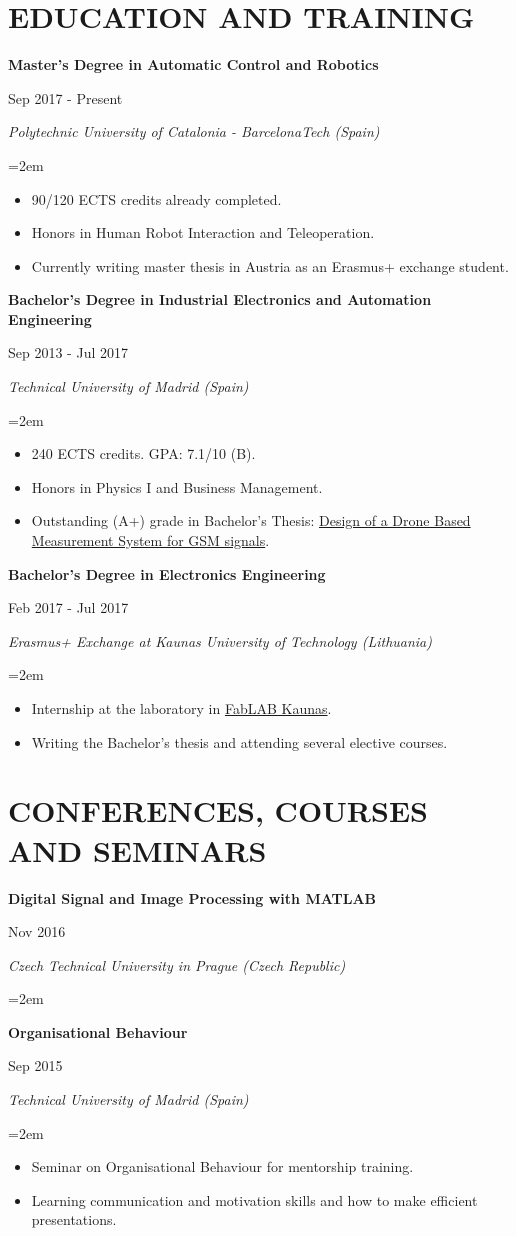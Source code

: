 \documentclass[10pt,a4paper,oneside]{book}
\newcommand{\sepspace}{\vspace*{0pt}}		%
\newcommand{\NewPart}[2]{\section*{\uppercase{#1} #2}}
\newcommand{\EducationEntrya}[4]{\noindent\ignorespaces	
		\begin{minipage}[t][][b]{0.8\textwidth} \raggedright{\textbf{#1}} \end{minipage} \hfill 
		\begin{minipage}[t][][b]{0.2\textwidth} \hfill\color{Black}#2 \end{minipage} 
		 
		\noindent \textit{#3} \par        %
		\noindent\hangindent=2em\hangafter=0 \small #4 
		\normalsize \par}
\begin{document}
\NewPart{Education and training}{}

\EducationEntrya{Master’s Degree in Automatic Control and Robotics }{Sep 2017 - Present}{Polytechnic University of Catalonia - BarcelonaTech (Spain)}{\begin{itemize}
\item 90/120 ECTS credits already completed.
\item Honors in Human Robot Interaction and Teleoperation.
\item Currently writing master thesis in Austria as an Erasmus+ exchange student.
\end{itemize}}

\sepspace
\EducationEntrya{Bachelor's Degree in Industrial Electronics and Automation Engineering
\\}{Sep 2013 - Jul 2017}{Technical University of Madrid (Spain)}{\begin{itemize} \item 240 ECTS credits. GPA: 7.1/10 (B). \item Honors in Physics I and Business Management. \item Outstanding (A+) grade in Bachelor's Thesis: \href{https://drive.google.com/file/d/0BxCxXmj96TUnZFdvaTduZUxCazQ/view?usp=sharing}{Design of a Drone Based  Measurement System for GSM signals}.\end{itemize}}
\sepspace

\EducationEntrya{Bachelor's Degree in Electronics Engineering}{Feb 2017 - Jul 2017}{Erasmus+ Exchange at Kaunas University of Technology (Lithuania)}{\begin{itemize}\item Internship at the laboratory in \href{https://fablabkaunas.lt/}{FabLAB Kaunas}. \item Writing the Bachelor's thesis and attending several elective courses. \end{itemize}}
\sepspace

\NewPart{Conferences, courses and seminars}{}
\EducationEntrya{Digital Signal and Image Processing with MATLAB}{Nov 2016}{Czech Technical University in Prague (Czech Republic)}{}
\EducationEntrya{Organisational Behaviour}{Sep 2015}{Technical University of Madrid (Spain)}{\begin{itemize}\item Seminar on Organisational Behaviour for mentorship training.
\item Learning communication and motivation skills and how to make efficient presentations. \end{itemize}}
\end{document}
